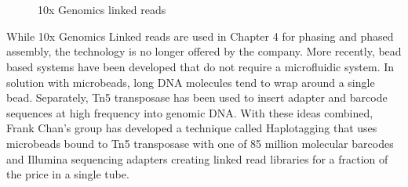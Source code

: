 \begin{figure}[htbp!]

\caption{10x Genomics linked reads}
\label{figure:linkedreads}
\begin{centering}
 \\
 \\
\end{centering}

\end{figure}

\par{
While 10x Genomics Linked reads are used in Chapter 4 for phasing and phased assembly, the technology is no longer offered by the company. More recently, bead based systems have been developed that do not require a microfluidic system. In solution with microbeads, long DNA molecules tend to wrap around a single bead\cite{beadphasing}\cite{LFR}. Separately, Tn5 transposase has been used to insert adapter and barcode sequences at high frequency into genomic DNA\cite{cptseq}. With these ideas combined, Frank Chan's group has developed a technique called Haplotagging that uses microbeads bound to Tn5 transposase with one of 85 million molecular barcodes and Illumina sequencing adapters creating linked read libraries for a fraction of the price in a single tube\cite{haplotagging}.
}


